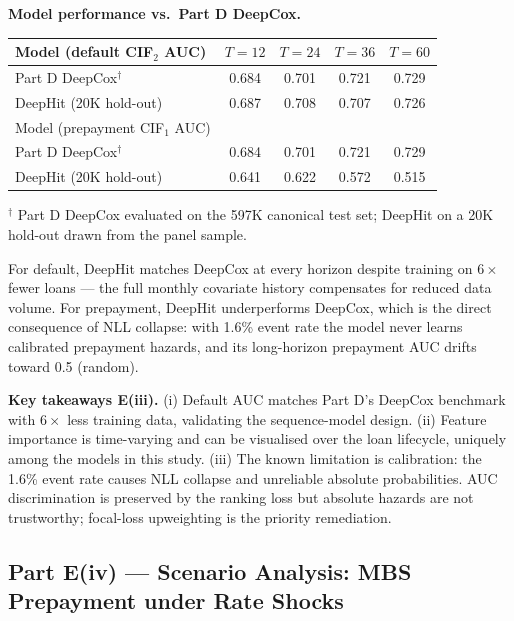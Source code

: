 \documentclass[11pt,a4paper]{article}
\begin{document}
\textbf{Model performance vs.\ Part D DeepCox.}

\begin{center}
  \small
  \begin{tabular}{lcccc}
    \toprule
    Model (default CIF$_2$ AUC)  & $T=12$    & $T=24$    & $T=36$    & $T=60$    \\
    \midrule
    Part D DeepCox$^\dagger$     & 0.684     & 0.701     & 0.721     & 0.729     \\
    DeepHit (20K hold-out)       & 0.687     & 0.708     & 0.707     & 0.726     \\
    \midrule
    Model (prepayment CIF$_1$ AUC) &           &           &           &           \\
    \midrule
    Part D DeepCox$^\dagger$     & 0.684     & 0.701     & 0.721     & 0.729     \\
    DeepHit (20K hold-out)       & 0.641     & 0.622     & 0.572     & 0.515     \\
    \bottomrule
  \end{tabular}
\end{center}
\noindent\footnotesize{$^\dagger$ Part D DeepCox evaluated on the 597K canonical test set; DeepHit on a 20K hold-out drawn from the panel sample.}\normalsize

For default, DeepHit matches DeepCox at every horizon despite training on $6\times$ fewer loans --- the full monthly covariate history compensates for reduced data volume. For prepayment, DeepHit underperforms DeepCox, which is the direct consequence of NLL collapse: with 1.6\% event rate the model never learns calibrated prepayment hazards, and its long-horizon prepayment AUC drifts toward 0.5 (random).

\textbf{Key takeaways E(iii).} (i) Default AUC matches Part D's DeepCox benchmark with $6\times$ less training data, validating the sequence-model design. (ii) Feature importance is time-varying and can be visualised over the loan lifecycle, uniquely among the models in this study. (iii) The known limitation is calibration: the 1.6\% event rate causes NLL collapse and unreliable absolute probabilities. AUC discrimination is preserved by the ranking loss but absolute hazards are not trustworthy; focal-loss upweighting is the priority remediation.

\subsection{Part E(iv) --- Scenario Analysis: MBS Prepayment under Rate Shocks}
\end{document}
